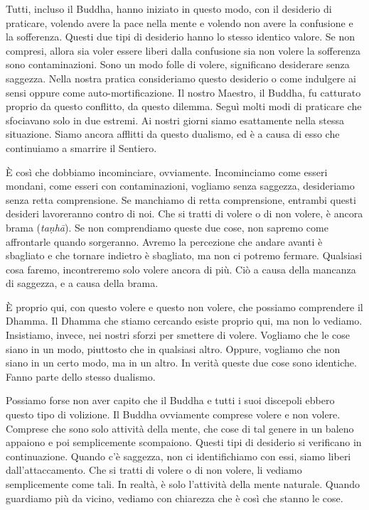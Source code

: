 Tutti, incluso il Buddha, hanno iniziato in questo modo, con il
desiderio di praticare, volendo avere la pace nella mente e volendo non
avere la confusione e la sofferenza. Questi due tipi di desiderio hanno
lo stesso identico valore. Se non compresi, allora sia voler essere
liberi dalla confusione sia non volere la sofferenza sono
contaminazioni. Sono un modo folle di volere, significano desiderare
senza saggezza. Nella nostra pratica consideriamo questo desiderio o
come indulgere ai sensi oppure come auto-mortificazione. Il nostro
Maestro, il Buddha, fu catturato proprio da questo conflitto, da questo
dilemma. Seguì molti modi di praticare che sfociavano solo in due
estremi. Ai nostri giorni siamo esattamente nella stessa situazione.
Siamo ancora afflitti da questo dualismo, ed è a causa di esso che
continuiamo a smarrire il Sentiero.

È così che dobbiamo incominciare, ovviamente. Incominciamo come esseri
mondani, come esseri con contaminazioni, vogliamo senza saggezza,
desideriamo senza retta comprensione. Se manchiamo di retta
comprensione, entrambi questi desideri lavoreranno contro di noi. Che si
tratti di volere o di non volere, è ancora brama (\emph{taṇhā}). Se non
comprendiamo queste due cose, non sapremo come affrontarle quando
sorgeranno. Avremo la percezione che andare avanti è sbagliato e che
tornare indietro è sbagliato, ma non ci potremo fermare. Qualsiasi cosa
faremo, incontreremo solo volere ancora di più. Ciò a causa della
mancanza di saggezza, e a causa della brama.

È proprio qui, con questo volere e questo non volere, che possiamo
comprendere il Dhamma. Il Dhamma che stiamo cercando esiste proprio qui,
ma non lo vediamo. Insistiamo, invece, nei nostri sforzi per smettere di
volere. Vogliamo che le cose siano in un modo, piuttosto che in
qualsiasi altro. Oppure, vogliamo che non siano in un certo modo, ma in
un altro. In verità queste due cose sono identiche. Fanno parte dello
stesso dualismo.

Possiamo forse non aver capito che il Buddha e tutti i suoi discepoli
ebbero questo tipo di volizione. Il Buddha ovviamente comprese volere e
non volere. Comprese che sono solo attività della mente, che cose di tal
genere in un baleno appaiono e poi semplicemente scompaiono. Questi tipi
di desiderio si verificano in continuazione. Quando c'è saggezza, non ci
identifichiamo con essi, siamo liberi dall'attaccamento. Che si tratti
di volere o di non volere, li vediamo semplicemente come tali. In
realtà, è solo l'attività della mente naturale. Quando guardiamo più da
vicino, vediamo con chiarezza che è così che stanno le cose.

